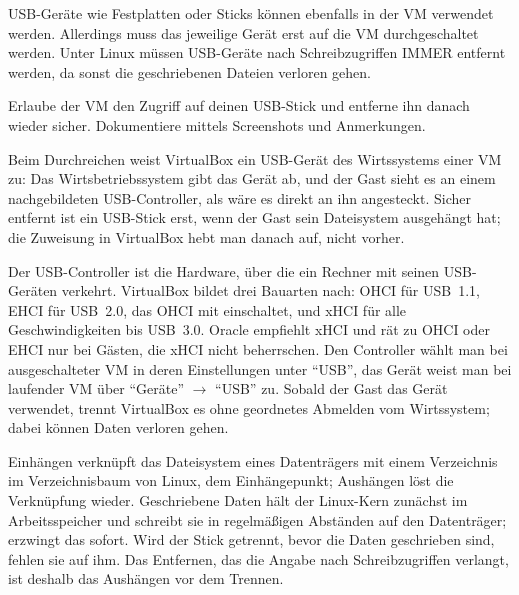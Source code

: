 \begin{aufgabe}
USB-Geräte wie Festplatten oder Sticks können ebenfalls in der VM verwendet werden. Allerdings muss das jeweilige Gerät erst auf die VM durchgeschaltet werden. Unter Linux müssen USB-Geräte nach Schreibzugriffen IMMER entfernt werden, da sonst die geschriebenen Dateien verloren gehen.

Erlaube der VM den Zugriff auf deinen USB-Stick und entferne ihn danach wieder sicher. Dokumentiere mittels Screenshots und Anmerkungen.
\end{aufgabe}
\label{sec:usb}

Beim Durchreichen weist VirtualBox ein USB-Gerät des Wirtssystems einer VM zu: Das Wirtsbetriebssystem gibt das Gerät ab, und der Gast sieht es an einem nachgebildeten USB-Controller, als wäre es direkt an ihn angesteckt. Sicher entfernt ist ein USB-Stick erst, wenn der Gast sein Dateisystem ausgehängt hat; die Zuweisung in VirtualBox hebt man danach auf, nicht vorher.

Der USB-Controller ist die Hardware, über die ein Rechner mit seinen USB-Geräten verkehrt. VirtualBox bildet drei Bauarten nach: OHCI für USB~1.1, EHCI für USB~2.0, das OHCI mit einschaltet, und xHCI für alle Geschwindigkeiten bis USB~3.0. Oracle empfiehlt xHCI und rät zu OHCI oder EHCI nur bei Gästen, die xHCI nicht beherrschen. Den Controller wählt man bei ausgeschalteter VM in deren Einstellungen unter \enquote{USB}, das Gerät weist man bei laufender VM über \enquote{Geräte} $\rightarrow$ \enquote{USB} zu. Sobald der Gast das Gerät verwendet, trennt VirtualBox es ohne geordnetes Abmelden vom Wirtssystem; dabei können Daten verloren gehen.

Einhängen verknüpft das Dateisystem eines Datenträgers mit einem Verzeichnis im Verzeichnisbaum von Linux, dem Einhängepunkt; Aushängen löst die Verknüpfung wieder. Geschriebene Daten hält der Linux-Kern zunächst im Arbeitsspeicher und schreibt sie in regelmäßigen Abständen auf den Datenträger;  erzwingt das sofort. Wird der Stick getrennt, bevor die Daten geschrieben sind, fehlen sie auf ihm. Das Entfernen, das die Angabe nach Schreibzugriffen verlangt, ist deshalb das Aushängen vor dem Trennen.

